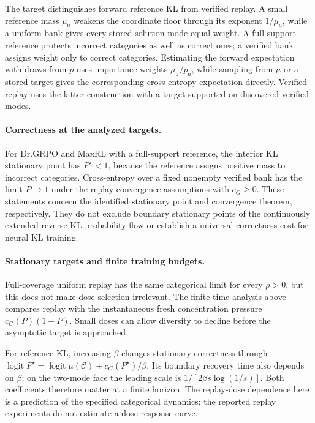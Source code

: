 \documentclass{article}
\newcommand{\1}{\mathbf 1}
\theoremstyle{remark}
\theoremstyle{definition}
\theoremstyle{plain}
\begin{document}
The target distinguishes forward reference KL from verified replay. A small
reference mass $\mu_a$ weakens the coordinate floor through its exponent
$1/\mu_a$, while a uniform bank gives every stored solution mode equal weight.
A full-support reference protects incorrect categories as well as correct
ones; a verified bank assigns weight only to correct categories. Estimating
the forward expectation with draws from $p$ uses importance weights
$\mu_a/p_a$, while sampling from $\mu$ or a stored target gives the corresponding
cross-entropy expectation directly. Verified replay uses the latter
construction with a target supported on discovered verified modes.

\paragraph{Correctness at the analyzed targets.}
For Dr.GRPO and MaxRL with a full-support reference, the interior KL
stationary point has $P^\star<1$, because the reference assigns positive
mass to incorrect categories. Cross-entropy over a fixed nonempty verified bank has the
limit $P\to1$ under the replay convergence assumptions with $c_G\ge0$. These statements concern the identified
stationary point and convergence theorem, respectively. They do not exclude
boundary stationary points of the continuously extended reverse-KL
probability flow or establish a universal correctness cost for neural KL
training.

\paragraph{Stationary targets and finite training budgets.}
Full-coverage uniform replay has the same categorical limit for every
$\rho>0$, but this does not make dose selection irrelevant.
The finite-time analysis above compares replay with the instantaneous
fresh concentration pressure $c_G(P)(1-P)$. Small doses can allow diversity
to decline before the asymptotic target is approached.

For reference KL, increasing $\beta$ changes stationary correctness through
$\operatorname{logit}P^\star=\operatorname{logit}\mu(\mathcal C)+c_G(P^\star)/\beta$.
Its boundary recovery time also depends on $\beta$; on the two-mode face
the leading scale is $1/[2\beta s\log(1/s)]$.
Both coefficients therefore matter at a finite horizon. The replay-dose
dependence here is a prediction of the specified categorical dynamics; the
reported replay experiments do not estimate a dose-response curve.
\end{document}
